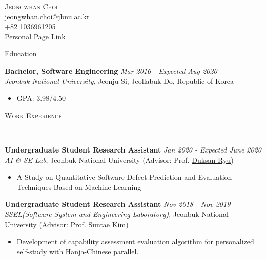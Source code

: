 \documentclass[10pt]{article}
\newenvironment{changemargin}[2]{
  \begin{list}{}{
    \setlength{\topsep}{0pt}
    \setlength{\leftmargin}{#1}
    \setlength{\rightmargin}{#2}
    \setlength{\listparindent}{\parindent}
    \setlength{\itemindent}{\parindent}
    \setlength{\parsep}{\parskip}
  }
  \item[]}{\end{list}
}
\newcommand{\lineover}{
	\begin{changemargin}{-0.05in}{-0.05in}
		\vspace*{-8pt}
		\hrulefill \\
		\vspace*{-2pt}
	\end{changemargin}
}
\newcommand{\header}[1]{
	\begin{changemargin}{-0.5in}{-0.5in}
		\scshape{#1}\\
  	\lineover
	\end{changemargin}
}
\newcommand{\contact}[5]{
	\begin{changemargin}{-0.5in}{-0.5in}
		\begin{center}
			{\Large \scshape {#1}}\\
      {#2} \\  {#3} \\ {#4} \\ {#5}
		\end{center}
	\end{changemargin}
}
\newenvironment{body} {
	\vspace*{-16pt}
	\begin{changemargin}{-0.25in}{-0.5in}
  }
	{\end{changemargin}
}
\begin{document}

\contact{Jeongwhan Choi}{\href{mailto:email@address.com}{jeongwhan.choi@jbnu.ac.kr}}{+82 1036961205}{\href{https://jeongwhanchoi.github.io}{Personal Page Link}}


\header{Education}

\begin{body}
	\vspace{14pt}
	\textbf{Bachelor, Software Engineering} \hfill \emph{Mar 2016 - Expected Aug 2020} \\
	\emph{Jeonbuk National University}, Jeonju Si, Jeollabuk Do, Republic of Korea \\
	\begin{itemize} \itemsep -0pt  %
	\item GPA: 3.98/4.50
	\end{itemize}

\end{body}

\medskip


\header{Work Experience}

\begin{body}
	\vspace{14pt}
	\textbf{Undergraduate Student Research Assistant} \hfill \emph{Jan 2020 - Expected June 2020} \\
	\emph{AI \& SE Lab}, Jeonbuk National University (Advisor: Prof. {\href{https://www.linkedin.com/in/duksanryu}{Duksan Ryu}})  \\
	\begin{itemize} \itemsep -0pt  %
      \item  A Study on Quantitative Software Defect Prediction and Evaluation Techniques Based on Machine Learning
  	\end{itemize}
	
	\textbf{Undergraduate Student Research Assistant} \hfill \emph{Nov 2018 - Nov 2019} \\
	\emph{SSEL(Software System and Engineering Laboratory)}, Jeonbuk National University (Advisor: Prof. {\href{https://sites.google.com/site/jipsin08/}{Suntae Kim}})  \\
	\begin{itemize} \itemsep -0pt  %
      \item  Development of capability assessment evaluation algorithm for personalized self-study with Hanja-Chinese parallel.
  	\end{itemize}


\end{body}
\end{document}
